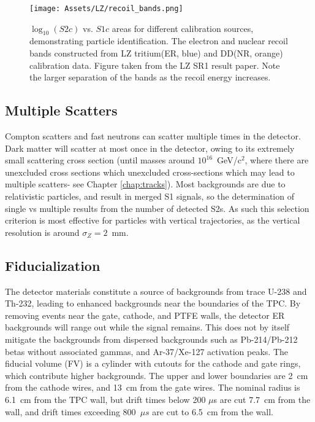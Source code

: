 \begin{figure}
    \centering
    \texttt{[image: Assets/LZ/recoil\_bands.png]}
    \caption[$\log_{10} (S2c)$ vs. $S1c$ areas for different calibration sources, demonstrating particle identification.]%
    { $\log_{10} (S2c)$ vs. $S1c$ areas for different calibration sources, demonstrating particle identification.
    The electron and nuclear recoil bands constructed from LZ tritium(ER, blue) and DD(NR, orange) calibration data. 
    Figure taken from the LZ SR1 result paper\cite{aalbers_darwin_2016}.
    Note the larger separation of the bands as the recoil energy increases.
    }
    \label{fig:recoil_bands}
\end{figure}
\subsection{Multiple Scatters}

Compton scatters and fast neutrons can scatter multiple times in the detector.
Dark matter will scatter at most once in the detector, owing to its extremely small scattering cross section (until masses around $10^{16}$~GeV/c$^2$, where there are unexcluded cross sections which unexcluded cross-sections which may lead to multiple scatters- see Chapter \ref{chap:tracks}).
Most backgrounds are  due to relativistic particles, and result in merged S1 signals, so the determination of single vs multiple results from the number of detected S2s.
As such this selection criterion is most effective for particles with vertical trajectories, as the vertical resolution is around $\sigma_Z=2$~mm.

\subsection{Fiducialization}
\label{sec:fiducial}
The detector materials constitute a source of backgrounds from trace U-238 and Th-232,
leading to enhanced backgrounds near the boundaries of the TPC.
By removing events near the gate, cathode, and PTFE walls, the detector ER backgrounds will range out while the signal remains.
This does not by itself mitigate the backgrounds from dispersed backgrounds such as Pb-214/Pb-212 betas without associated gammas, and Ar-37/Xe-127 activation peaks. 
The fiducial volume (FV) is a cylinder with cutouts for the cathode and gate rings, which contribute higher backgrounds.
The upper and lower boundaries are 2~cm from the cathode wires, and 13~cm from the gate wires.
The nominal radius is 6.1~cm from the TPC wall, but drift times below 200 $\mu $s are cut 7.7~cm from the wall, and drift times exceeding 800~$\mu s$ are cut to 6.5~cm from the wall.


